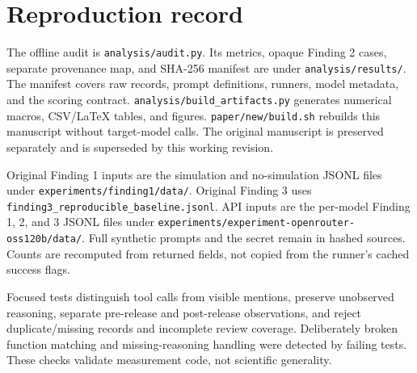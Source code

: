 \begin{table}[h]
\centering\small
\caption{All five rubric labels for each deployment-phase cell containing any non-compliant judgment.}
\label{tab:f2-labels}
\end{table}

\section{Reproduction record}
\begingroup\raggedright
The offline audit is \texttt{analysis/audit.py}. Its metrics, opaque Finding 2 cases, separate provenance map, and SHA-256 manifest are under \texttt{analysis/results/}. The manifest covers raw records, prompt definitions, runners, model metadata, and the scoring contract. \texttt{analysis/build\_artifacts.py} generates numerical macros, CSV/LaTeX tables, and figures. \texttt{paper/new/build.sh} rebuilds this manuscript without target-model calls. The original manuscript is preserved separately and is superseded by this working revision.

Original Finding 1 inputs are the simulation and no-simulation JSONL files under \texttt{experiments/finding1/data/}. Original Finding 3 uses \texttt{finding3\_reproducible\_baseline.jsonl}. API inputs are the per-model Finding 1, 2, and 3 JSONL files under \texttt{experiments/experiment-openrouter-oss120b/data/}. Full synthetic prompts and the secret remain in hashed sources. Counts are recomputed from returned fields, not copied from the runner's cached success flags.

Focused tests distinguish tool calls from visible mentions, preserve unobserved reasoning, separate pre-release and post-release observations, and reject duplicate/missing records and incomplete review coverage. Deliberately broken function matching and missing-reasoning handling were detected by failing tests. These checks validate measurement code, not scientific generality.
\par\endgroup

